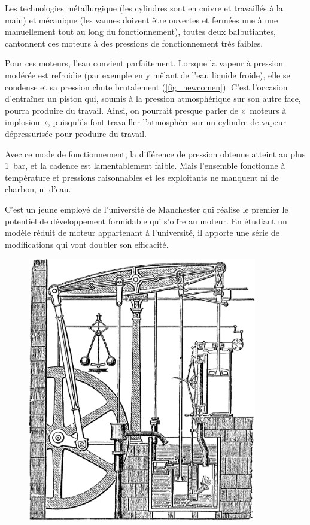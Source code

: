 	Les technologies métallurgique (les cylindres sont en cuivre et travaillés à la main) et mécanique (les vannes doivent être ouvertes et fermées une à une manuellement tout au long du fonctionnement), toutes deux balbutiantes, cantonnent ces moteurs à des pressions de fonctionnement très faibles.

	Pour ces moteurs, l’eau convient parfaitement. Lorsque la vapeur à pression modérée est refroidie (par exemple en y mêlant de l’eau liquide froide), elle se condense et sa pression chute brutalement (\cref{fig_newcomen}). C’est l’occasion d’entraîner un piston qui, soumis à la pression atmosphérique sur son autre face, pourra produire du travail. Ainsi, on pourrait presque parler de «~moteurs à implosion~», puisqu’ils font travailler l’atmosphère sur un cylindre de vapeur dépressurisée pour produire du travail.

	Avec ce mode de fonctionnement, la différence de pression obtenue atteint au plus \SI{1}{\bar}, et la cadence est lamentablement faible. Mais l’ensemble fonctionne à température et pressions raisonnables et les exploitants ne manquent ni de charbon, ni d’eau.

	C’est un jeune employé de l’université de Manchester qui réalise le premier le potentiel de développement formidable qui s’offre au moteur. En étudiant un modèle réduit de moteur appartenant à l’université, il apporte une série de modifications qui vont doubler son efficacité.

	\begin{figure}
	\begin{center}
		\includegraphics[width=10cm]{images/steam_engine_boulton_watt.png}
	\end{center}
	\label{fig_boultonwattengine}
	\end{figure}

